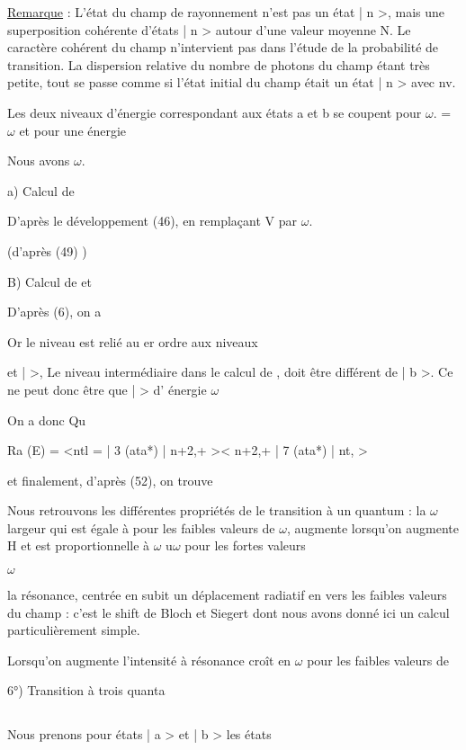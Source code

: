 \ul{Remarque} : L'état du champ de rayonnement n'est pas un état | n >, mais une superposition
cohérente d'états | n > autour d'une valeur moyenne N. Le caractère
cohérent du champ n'intervient pas dans l'étude de la probabilité de transition.
La dispersion relative du nombre de photons du champ  étant très
petite, tout se passe comme si l'état initial du champ était un état | n >
avec nv.

Les deux niveaux d'énergie correspondant aux états a et b se coupent
pour $\omega$. = $\omega$ et pour une énergie 

Nous avons $\omega$.

a) Calcul de 

D'après le développement (46), en remplaçant V par
$\omega$.

(d'après (49) )


B) Calcul de  et 

D'après (6), on a

Or le niveau  est relié au er ordre aux niveaux

et |  >, Le niveau intermédiaire dans le calcul de ,  doit être différent de | b >.
Ce ne peut donc être que |  > d' énergie $\omega$

On a donc
Qu

Ra (E) = <ntl = | 3 (ata*) | n+2,+ >< n+2,+ | 7 (ata*) | nt, >

et finalement, d'après (52), on trouve

Nous retrouvons les différentes propriétés de le transition à un quantum : la
$\omega$
largeur qui est égale à  pour les faibles valeurs de $\omega$, augmente lorsqu'on
augmente H et est proportionnelle à $\omega$ u$\omega$ pour les fortes valeurs


$\omega$

la résonance, centrée en  subit un déplacement radiatif en
 vers les faibles valeurs du champ : c'est le shift de Bloch et Siegert
dont nous avons donné ici un calcul particulièrement simple.

Lorsqu'on augmente  l'intensité à résonance croît en $\omega$ pour
les faibles valeurs de 

6°) Transition à trois quanta
\subsection{}%

Nous prenons pour états | a > et | b > les états


